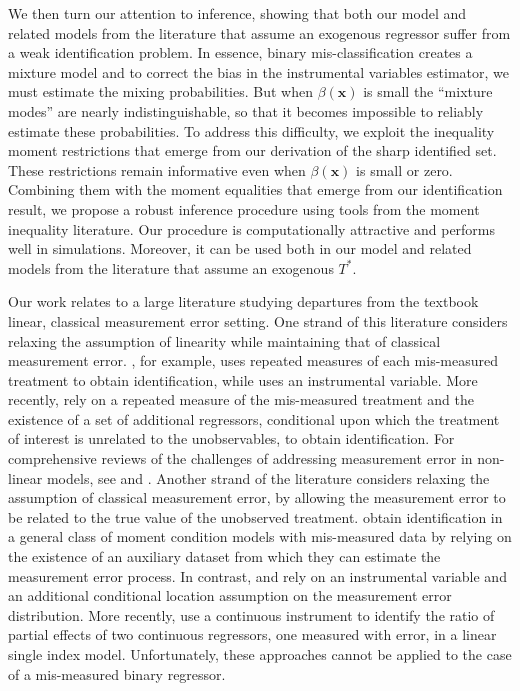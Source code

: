 We then turn our attention to inference, showing that both our model and related models from the literature that assume an exogenous regressor suffer from a weak identification problem. 
In essence, binary mis-classification creates a mixture model and to correct the bias in the instrumental variables estimator, we must estimate the mixing probabilities.
But when $\beta(\mathbf{x})$ is small the ``mixture modes'' are nearly indistinguishable, so that it becomes impossible to reliably estimate these probabilities.
To address this difficulty, we exploit the inequality moment restrictions that emerge from our derivation of the sharp identified set.
These restrictions remain informative even when $\beta(\mathbf{x})$ is small or zero.
Combining them with the moment equalities that emerge from our identification result, we propose a robust inference procedure using tools from the moment inequality literature.
Our procedure is computationally attractive and performs well in simulations.
Moreover, it can be used both in our model and related models from the literature that assume an exogenous $T^*$. 

Our work relates to a large literature studying departures from the textbook linear, classical measurement error setting.
One strand of this literature considers relaxing the assumption of linearity while maintaining that of classical measurement error.
\cite{schennach2004}, for example, uses repeated measures of each mis-measured treatment to obtain identification, while \cite{schennach2007} uses an instrumental variable.  
More recently, \cite{SongSchennachWhite} rely on a repeated measure of the mis-measured treatment and the existence of a set of additional regressors, conditional upon which the treatment of interest is unrelated to the unobservables, to obtain identification.      
For comprehensive reviews of the challenges of addressing measurement error in non-linear models, see  \cite{chensurvey} and \cite{SchennachSurvey}.
Another strand of the literature considers relaxing the assumption of classical measurement error, by allowing the measurement error to be related to the true value of the unobserved treatment.
\cite{ChenHongTamer} obtain identification in a general class of moment condition models with mis-measured data by relying on the existence of an auxiliary dataset from which they can estimate the measurement error process.
In contrast, \cite{HuSchennach} and \cite{song2015} rely on an instrumental variable and an additional conditional location assumption on the measurement error distribution. 
More recently, \cite{HuShiuWoutersen} use a continuous instrument to identify the ratio of partial effects of two continuous regressors, one measured with error, in a linear single index model.
Unfortunately, these approaches cannot be applied to the case of a mis-measured binary regressor.


